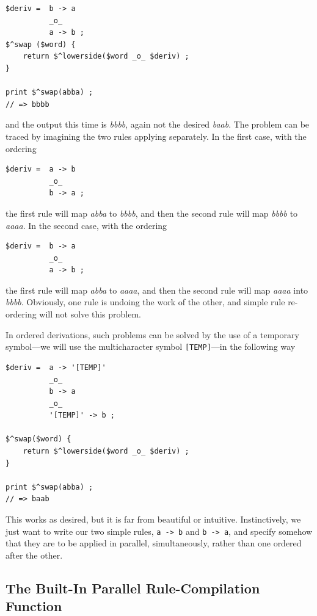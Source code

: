 \begin{Verbatim}
$deriv =  b -> a
          _o_
          a -> b ;
$^swap ($word) { 
    return $^lowerside($word _o_ $deriv) ;
}

print $^swap(abba) ;
// => bbbb
\end{Verbatim}

\noindent
and the output this time is \emph{bbbb}, again not the desired \emph{baab}.  The problem
can be traced by imagining the two rules applying separately.  In the first case, with the
ordering


\begin{Verbatim}
$deriv =  a -> b
          _o_
          b -> a ;
\end{Verbatim}

\noindent
the first rule will map \emph{abba} to \emph{bbbb}, and then the second rule will map
\emph{bbbb} to \emph{aaaa}.  In the second case, with the ordering


\begin{Verbatim}
$deriv =  b -> a
          _o_
          a -> b ;
\end{Verbatim}

\noindent
the first rule will map \emph{abba} to \emph{aaaa}, and then the second rule will map
\emph{aaaa} into \emph{bbbb}.  Obviously, one rule is undoing the work
of the other, and simple rule re-ordering will not solve this
problem.

In ordered derivations, such problems can be solved by the use of a temporary symbol---we
will use the multicharacter symbol \verb![TEMP]!---in the following way


\begin{Verbatim}
$deriv =  a -> '[TEMP]'
          _o_
          b -> a
          _o_
          '[TEMP]' -> b ;

$^swap($word) {
    return $^lowerside($word _o_ $deriv) ;
}

print $^swap(abba) ;
// => baab
\end{Verbatim}

\noindent
This works as desired, but it is far from beautiful or intuitive.  
Instinctively, we just want to write our two
simple rules, \verb!a -> b! and \verb!b -> a!, and specify somehow that they are to be
applied in parallel, simultaneously, rather than one ordered after the other. 

\newcommand{\dollar}{\char'44}

\subsection{The Built-In Parallel Rule-Compilation Function}

